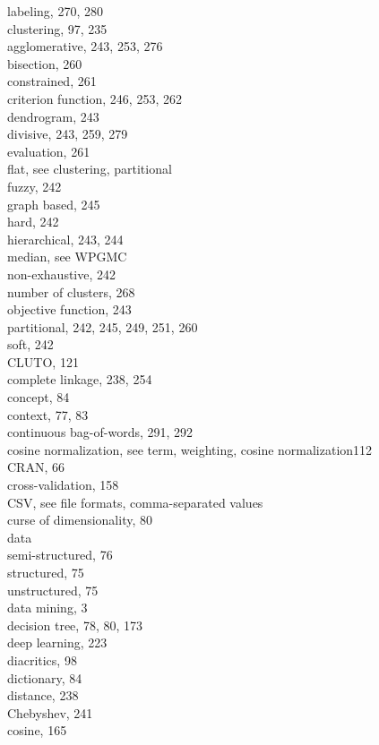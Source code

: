 \documentclass[10pt]{book}
\begin{document}
labeling, 270, 280\\
clustering, 97, 235\\
agglomerative, 243, 253, 276\\
bisection, 260\\
constrained, 261\\
criterion function, 246, 253, 262\\
dendrogram, 243\\
divisive, 243, 259, 279\\
evaluation, 261\\
flat, see clustering, partitional\\
fuzzy, 242\\
graph based, 245\\
hard, 242\\
hierarchical, 243, 244\\
median, see WPGMC\\
non-exhaustive, 242\\
number of clusters, 268\\
objective function, 243\\
partitional, 242, 245, 249, 251, 260\\
soft, 242\\
CLUTO, 121\\
complete linkage, 238, 254\\
concept, 84\\
context, 77, 83\\
continuous bag-of-words, 291, 292\\
cosine normalization, see term, weighting, cosine normalization112\\
CRAN, 66\\
cross-validation, 158\\
CSV, see file formats, comma-separated values\\
curse of dimensionality, 80\\
data\\
semi-structured, 76\\
structured, 75\\
unstructured, 75\\
data mining, 3\\
decision tree, 78, 80, 173\\
deep learning, 223\\
diacritics, 98\\
dictionary, 84\\
distance, 238\\
Chebyshev, 241\\
cosine, 165\\
\end{document}
